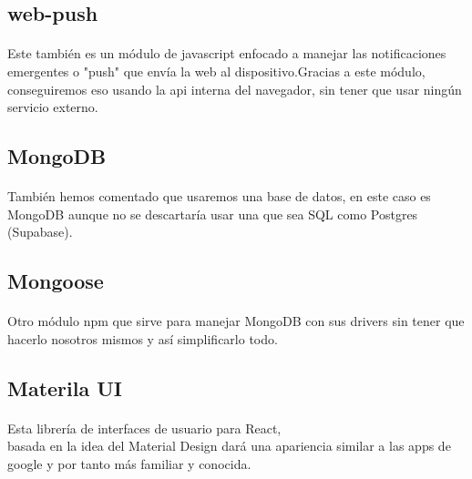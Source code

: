 \documentclass[a4paper]{article}
\begin{document}
    \subsection[Web-Push]{web-push}
    \paragraph{}
    Este también es un módulo de javascript enfocado a manejar las notificaciones emergentes o "push" 
    que envía la web al dispositivo.Gracias a este módulo, conseguiremos eso usando la api interna del 
    navegador, sin tener que usar ningún servicio externo.
    \subsection[MongoDB]{MongoDB}
    \paragraph{}
    También hemos comentado que usaremos una base de datos, en este caso es MongoDB aunque 
    no se descartaría usar una que sea SQL como Postgres (Supabase).
    \subsection[Mongoose]{Mongoose}
    \paragraph{}
    Otro módulo npm que sirve para manejar MongoDB con sus drivers sin tener que hacerlo 
    nosotros mismos y así simplificarlo todo.
    \subsection[MUI]{Materila UI}
    \paragraph{}
    Esta librería de interfaces de usuario para React,\\ basada en la idea del Material Design 
    dará una apariencia similar a las apps de google y por tanto más familiar y conocida.
\end{document}
